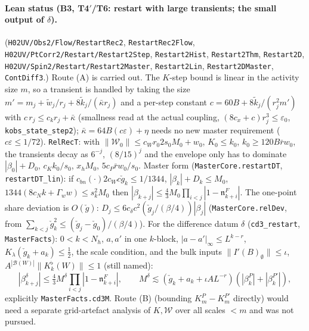 \documentclass[11pt]{amsart}
\theoremstyle{definition}
\theoremstyle{remark}
\numberwithin{equation}{section}
\begin{document}
\paragraph{Lean status (B3, T4$'$/T6: restart with large transients; the small output of $\delta$).}
(\texttt{H02UV/Obs2/Flow/RestartRec2}, \texttt{RestartRec2Flow}, \texttt{H02UV/PtCorr2/Restart/Restart2Step}, \texttt{Restart2Hist},
\texttt{Restart2Thm}, \texttt{Restart2D}, \texttt{H02UV/Spin2/Restart/Restart2Master}, \texttt{Restart2Lin}, \texttt{Restart2DMaster},
\texttt{ContDiff3}.) Route (A) is carried out. The $K$-step bound is linear in the activity size $m$, so a transient
is handled by taking the size $m'=m_j+\tilde w_j/r_j+8\tilde k_j/(\bar\kappa r_j)$ and a per-step constant
$c=60B+8\tilde k_j/(r_j^2m')$ with $c\,r_j\le c_kr_j+\bar\kappa$ (smallness read at the actual coupling,
$(8c_x+c)r_j^3\le\varepsilon_0$, \texttt{kobs\_state\_step2}); $\bar\kappa=64B(c\varepsilon)+\eta$ needs no new master
requirement ($c\varepsilon\le1/72$). \texttt{RelRecT}: with $\|\mathcal W_0\|\le c_Wr_0 2s_0M_0+w_0$, $K_0\le k_0$,
$k_0\ge120B\bar r w_0$, the transients decay as $6^{-j}$, $(8/15)^j$ and the envelope only has to dominate
$|\beta_0|+D_0$, $c_Kk_0/s_0$, $x_hM_0$, $5c_P\bar rw_0/s_0$. Master form (\texttt{MasterCore.restartDT},
\texttt{restartDT\_lin}): if $c_{bn}(\cdot)2c_W c\check g_k\le1/1344$, $|\beta_k|+D_k\le M_0$,
$1344(8c_Nk+\Gamma_ww)\le s_k^2M_0$ then $|\beta_{k+j}|\le\frac43M_0\prod_{i<j}|1-\mathfrak n^F_{k+i}|$.
The one-point share deviation is $O(\check g)$: $D_j\le6c_\delta c^2(\check g_j/(\beta/4))|\beta_j|$
(\texttt{MasterCore.relDev}, from $\sum_{k<j}\check g_k^2\le(\check g_j-\check g_0)/(\beta/4)$). For the difference
datum $\delta$ (\texttt{cd3\_restart}, \texttt{MasterFacts}): $0<k<N_h$, $a,a'$ in one $k$-block,
$|a-a'|_\infty\le L^{k-r}$, $K_\lambda(\check g_k+a_k)\le\frac12$, the scale condition, and the bulk inputs
$\|I'(B)_\emptyset\|\le\iota$, $A^{|\mathcal B(W)|}\|K^\flat_k(W)\|\le1$ (still named):
\[
|\beta^\delta_{k+j}|\le\tfrac43M^\delta\prod_{i<j}|1-\mathfrak n^F_{k+i}|,\qquad
M^\delta\lesssim(\check g_k+a_k+\iota A L^{-r})(|\beta^P_k|+|\beta^{P'}_k|),
\]
explicitly \texttt{MasterFacts.cd3M}. Route (B) (bounding $K^P_m-K^{P'}_m$ directly) would need a separate grid-artefact
analysis of $K,\mathcal W$ over all scales $<m$ and was not pursued.
\end{document}
